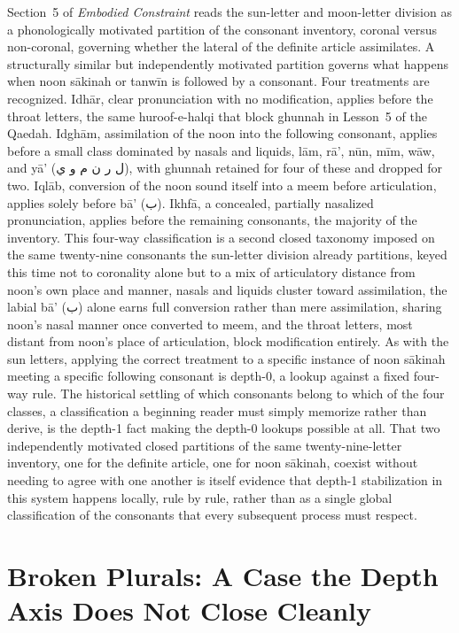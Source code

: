 \documentclass[11pt]{article}
\newcommand{\ar}[1]{\textarabic{#1}}
\begin{document}
Section~5 of \emph{Embodied Constraint} reads the sun-letter and moon-letter
division as a phonologically motivated partition of the consonant
inventory, coronal versus non-coronal, governing whether the lateral of the
definite article assimilates. A structurally similar but independently
motivated partition governs what happens when noon sākinah or tanwīn is
followed by a consonant. Four treatments are recognized. Idhār, clear
pronunciation with no modification, applies before the throat letters,
the same huroof-e-halqi that block ghunnah in Lesson~5 of the Qaedah.
Idghām, assimilation of the noon into the following consonant, applies
before a small class dominated by nasals and liquids, l\=am, r\=a',
n\=un, m\=im, w\=aw, and y\=a' (\ar{ل ر ن م و ي}), with
ghunnah retained for four of these and dropped for two. Iqlāb, conversion
of the noon sound itself into a meem before articulation, applies solely
before b\=a' (\ar{ب}). Ikhfā, a concealed, partially nasalized pronunciation, applies
before the remaining consonants, the majority of the inventory. This
four-way classification is a second closed taxonomy imposed on the same
twenty-nine consonants the sun-letter division already partitions, keyed
this time not to coronality alone but to a mix of articulatory distance
from noon's own place and manner, nasals and liquids cluster toward
assimilation, the labial b\=a' (\ar{ب}) alone earns full conversion rather than mere
assimilation, sharing noon's nasal manner once converted to meem, and the
throat letters, most distant from noon's place of articulation, block
modification entirely. As with the sun letters, applying the correct
treatment to a specific instance of noon sākinah meeting a specific
following consonant is depth-0, a lookup against a fixed four-way rule.
The historical settling of which consonants belong to which of the four
classes, a classification a beginning reader must simply memorize rather
than derive, is the depth-1 fact making the depth-0 lookups possible at
all. That two independently motivated closed partitions of the same
twenty-nine-letter inventory, one for the definite article, one for noon
sākinah, coexist without needing to agree with one another is itself
evidence that depth-1 stabilization in this system happens locally, rule
by rule, rather than as a single global classification of the consonants
that every subsequent process must respect.

\section{Broken Plurals: A Case the Depth Axis Does Not Close Cleanly}
\end{document}
